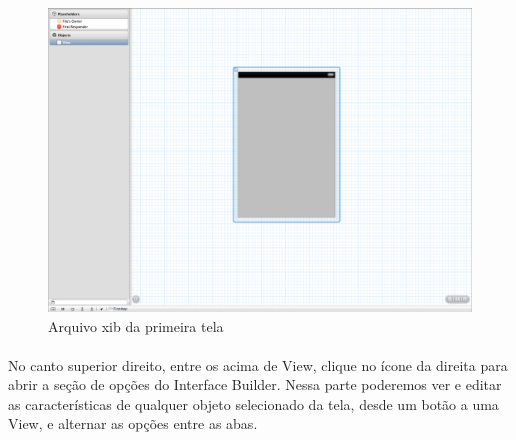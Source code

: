 \documentclass[a4paper,12pt,brazil,doubleside]{book}
\begin{document}
\begin{figure}[h]
  \centering
  \includegraphics[totalheight=0.25\textheight]{../figuras/ios/1/xib.png}
  \caption{Arquivo xib da primeira tela}
  \label{fig:a}
\end{figure}

\bigskip

\paragraph{}No canto superior direito, entre os acima de View, clique no ícone da direita  para abrir a seção de opções do Interface Builder. Nessa parte poderemos ver e editar as características de qualquer objeto selecionado da tela, desde um botão a uma View, e alternar as opções entre as abas.
\end{document}
